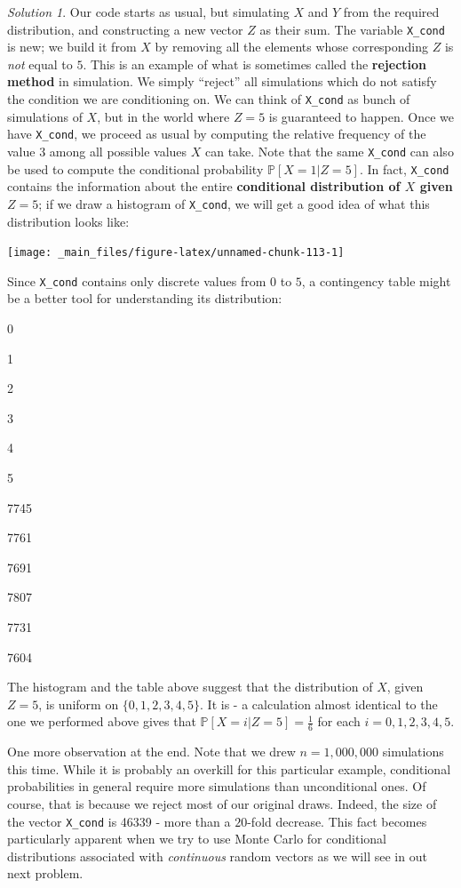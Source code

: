 \documentclass[
]{book}
\theoremstyle{definition}
\theoremstyle{definition}
\theoremstyle{definition}
\theoremstyle{definition}
\theoremstyle{remark}
\newtheorem*{solution}{Solution}
\begin{document}
\begin{solution}
Our code starts as usual, but simulating \(X\) and \(Y\) from the required
distribution, and constructing a new vector \(Z\) as their sum. The variable
\texttt{X\_cond} is new; we build it from \(X\) by removing all the elements whose
corresponding \(Z\) is \emph{not} equal to \(5\). This is an example of what is sometimes
called the \textbf{rejection method} in simulation. We simply ``reject'' all
simulations which do not satisfy the condition we are conditioning on. We can
think of \texttt{X\_cond} as bunch of simulations of \(X\), but in the world where \(Z=5\)
is guaranteed to happen. Once we have \texttt{X\_cond}, we proceed as usual by computing
the relative frequency of the value \(3\) among all possible values \(X\) can take.
Note that the same \texttt{X\_cond} can also be used to compute the conditional
probability \({\mathbb{P}}[ X=1| Z=5]\). In fact, \texttt{X\_cond} contains the information about
the entire \textbf{conditional distribution of \(X\) given \(Z=5\)}; if we draw a
histogram of \texttt{X\_cond}, we will get a good idea of what this distribution looks
like:

\begin{center}\texttt{[image: \_main\_files/figure-latex/unnamed-chunk-113-1]} \end{center}

Since \texttt{X\_cond} contains only discrete values from \(0\) to \(5\), a contingency
table might be a better tool for understanding its distribution:

0

1

2

3

4

5

7745

7761

7691

7807

7731

7604

The histogram and the table above suggest that the distribution of \(X\), given \(Z=5\), is uniform on \(\{0,1,2,3,4,5\}\). It is - a calculation almost identical to the one we performed above gives that \({\mathbb{P}}[ X= i| Z=5] = \frac{1}{6}\) for each \(i=0,1,2,3,4,5\).

One more observation at the end. Note that we drew \(n=1,000,000\) simulations this time. While it is probably an overkill for this particular example, conditional probabilities in general require more simulations than unconditional ones. Of course, that is because we reject most of our original draws. Indeed, the size of the vector \texttt{X\_cond} is 46339 - more than a \(20\)-fold decrease. This fact becomes particularly apparent when we try to use Monte Carlo for conditional distributions associated with \emph{continuous} random vectors as we will see in out next problem.
\end{solution}
\end{document}
